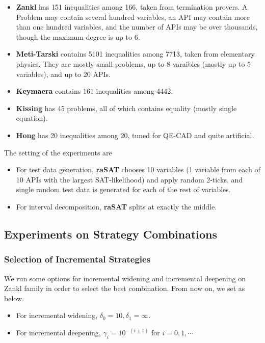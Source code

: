 \documentclass[runningheads,a4paper,oribibl]{llncs}
\begin{document}
\begin{itemize}
\item {\bf Zankl} has 151 inequalities among 166, taken from termination provers. 
A Problem may contain several hundred variables, an API may contain more than one hundred variables, 
and the number of APIs may be over thousands, though the maximum degree is up to $6$. 
\item {\bf Meti-Tarski} contains 5101 inequalities among 7713, taken from elementary physics.
They are mostly small problems, up to 8 varaibles (mostly up to 5 variables), and up to 20 APIs. 
\item {\bf Keymaera} contains 161 inequalities among 4442. 
\item {\bf Kissing} has 45 problems, all of which contains equality (mostly single equation). 
\item {\bf Hong} has 20 inequalities among 20, tuned for QE-CAD and quite artificial. 
\end{itemize}

The setting of the experiments are
\begin{itemize}
\item For test data generation, {\bf raSAT} chooses 10 variables (1 variable from each of 10 APIs
  with the largest SAT-likelihood) and apply random 2-ticks, and single random test data is
  generated for each of the rest of variables.
\item For interval decomposition, {\bf raSAT} splits at exactly the middle. 
\end{itemize}


\subsection{Experiments on Strategy Combinations} \label{sec:expstrategy}

\subsubsection*{Selection of Incremental Strategies}
We run some options for incremental widening and incremental deepening on Zankl family
in order to select the best combination. From now on, we set as below. 
\begin{itemize}
\item For incremental widening, $\delta_0 = 10, \delta_1 = \infty$.
\item For incremental deepening, $\gamma_i = 10^{-(i+1)}$ for $i = 0, 1, \cdots$
\end{itemize}
\end{document}
